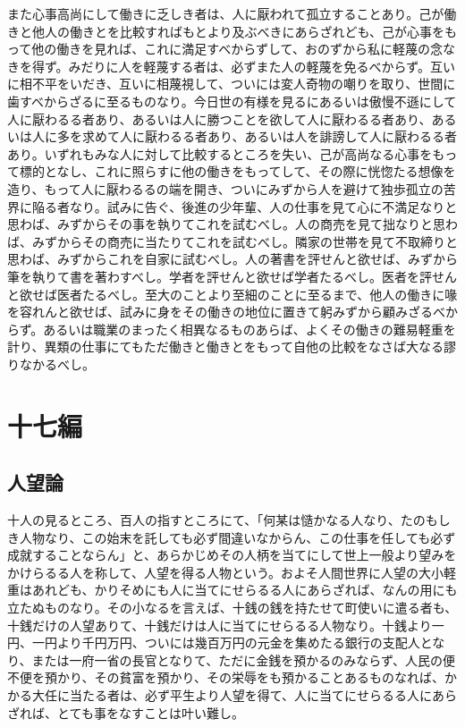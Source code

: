 \documentclass[a4paper, platex, dvipdfmx]{jsarticle}
\begin{document}
また心事高尚にして働きに乏しき者は、人に厭われて孤立することあり。己が働きと他人の働きとを比較すればもとより及ぶべきにあらざれども、己が心事をもって他の働きを見れば、これに満足すべからずして、おのずから私に軽蔑の念なきを得ず。みだりに人を軽蔑する者は、必ずまた人の軽蔑を免るべからず。互いに相不平をいだき、互いに相蔑視して、ついには変人奇物の嘲りを取り、世間に歯すべからざるに至るものなり。今日世の有様を見るにあるいは傲慢不遜にして人に厭わるる者あり、あるいは人に勝つことを欲して人に厭わるる者あり、あるいは人に多を求めて人に厭わるる者あり、あるいは人を誹謗して人に厭わるる者あり。いずれもみな人に対して比較するところを失い、己が高尚なる心事をもって標的となし、これに照らすに他の働きをもってして、その際に恍惚たる想像を造り、もって人に厭わるるの端を開き、ついにみずから人を避けて独歩孤立の苦界に陥る者なり。試みに告ぐ、後進の少年輩、人の仕事を見て心に不満足なりと思わば、みずからその事を執りてこれを試むべし。人の商売を見て拙なりと思わば、みずからその商売に当たりてこれを試むべし。隣家の世帯を見て不取締りと思わば、みずからこれを自家に試むべし。人の著書を評せんと欲せば、みずから筆を執りて書を著わすべし。学者を評せんと欲せば学者たるべし。医者を評せんと欲せば医者たるべし。至大のことより至細のことに至るまで、他人の働きに喙を容れんと欲せば、試みに身をその働きの地位に置きて躬みずから顧みざるべからず。あるいは職業のまったく相異なるものあらば、よくその働きの難易軽重を計り、異類の仕事にてもただ働きと働きとをもって自他の比較をなさば大なる謬りなかるべし。

\section{十七編}
\subsection{人望論}
十人の見るところ、百人の指すところにて、「何某は慥かなる人なり、たのもしき人物なり、この始末を託しても必ず間違いなからん、この仕事を任しても必ず成就することならん」と、あらかじめその人柄を当てにして世上一般より望みをかけらるる人を称して、人望を得る人物という。およそ人間世界に人望の大小軽重はあれども、かりそめにも人に当てにせらるる人にあらざれば、なんの用にも立たぬものなり。その小なるを言えば、十銭の銭を持たせて町使いに遣る者も、十銭だけの人望ありて、十銭だけは人に当てにせらるる人物なり。十銭より一円、一円より千円万円、ついには幾百万円の元金を集めたる銀行の支配人となり、または一府一省の長官となりて、ただに金銭を預かるのみならず、人民の便不便を預かり、その貧富を預かり、その栄辱をも預かることあるものなれば、かかる大任に当たる者は、必ず平生より人望を得て、人に当てにせらるる人にあらざれば、とても事をなすことは叶い難し。
\end{document}
